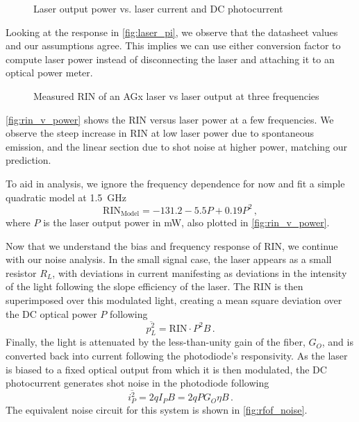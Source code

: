 \begin{figure}[ht!]
    \centering
    
    \caption{Laser output power vs. laser current and DC photocurrent}
    \label{fig:laser_pi}
\end{figure}

Looking at the response in \autoref{fig:laser_pi}, we observe that the datasheet values and our assumptions agree.
This implies we can use either conversion factor to compute laser power instead of disconnecting the laser and attaching it to an optical power meter.

\begin{figure}[ht!]
    \centering
    
    \caption{Measured RIN of an AGx laser vs laser output at three frequencies}
    \label{fig:rin_v_power}
\end{figure}

\autoref{fig:rin_v_power} shows the RIN versus laser power at a few frequencies.
We observe the steep increase in RIN at low laser power due to spontaneous emission, and the linear section due to shot noise at higher power, matching our prediction.

To aid in analysis, we ignore the frequency dependence for now and fit a simple quadratic model at \qty{1.5}{\GHz}
\begin{equation}
    \text{RIN}_\text{Model} = -131.2 - 5.5P + 0.19P^2 \,,
    \label{eq:rin_model}
\end{equation}
where $P$ is the laser output power in mW, also plotted in \autoref{fig:rin_v_power}.

Now that we understand the bias and frequency response of RIN, we continue with our noise analysis.
In the small signal case, the laser appears as a small resistor $R_L$, with deviations in current manifesting as deviations in the intensity of the light following the slope efficiency of the laser.
The RIN is then superimposed over this modulated light, creating a mean square deviation over the DC optical power $P$ following
\begin{equation}
    \overline{p_L^2} = \text{RIN}\cdot P^2B \,.
\end{equation}
Finally, the light is attenuated by the less-than-unity gain of the fiber, $G_O$, and is converted back into current following the photodiode's responsivity.
As the laser is biased to a fixed optical output from which it is then modulated, the DC photocurrent generates shot noise in the photodiode following
\begin{equation}
    \overline{i_P^2} = 2qI_PB = 2qPG_O\eta B \,.
\end{equation}
The equivalent noise circuit for this system is shown in \autoref{fig:rfof_noise}.

